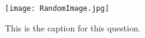 \begin{figure}[!ht]  
   \centering
   \texttt{[image: RandomImage.jpg]}
   \caption{This is the caption for this question.}
   \label{fig:questionA1}                             %
    \addtocounter{figure}{-1}
\end{figure}

